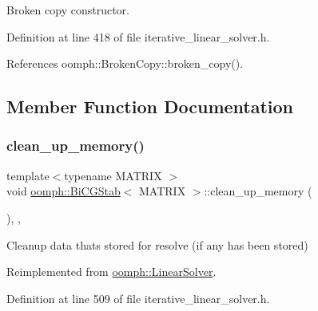 Broken copy constructor. 



Definition at line 418 of file iterative\+\_\+linear\+\_\+solver.\+h.



References oomph\+::\+Broken\+Copy\+::broken\+\_\+copy().



\subsection{Member Function Documentation}
\mbox{\label{classoomph_1_1BiCGStab_a6c97b794a4bec6a22df28f5f160577be}} 
\subsubsection{\texorpdfstring{clean\+\_\+up\+\_\+memory()}{clean\_up\_memory()}}
{\footnotesize\ttfamily template$<$typename M\+A\+T\+R\+IX $>$ \\
void \hyperlink{classoomph_1_1BiCGStab}{oomph\+::\+Bi\+C\+G\+Stab}$<$ M\+A\+T\+R\+IX $>$\+::clean\+\_\+up\+\_\+memory (\begin{DoxyParamCaption}{ }\end{DoxyParamCaption})\hspace{0.3cm}{\ttfamily [inline]}, {\ttfamily [private]}, {\ttfamily [virtual]}}



Cleanup data that\textquotesingle{}s stored for resolve (if any has been stored) 



Reimplemented from \hyperlink{classoomph_1_1LinearSolver_a9d66f3262e80ca06a365f98216afd85f}{oomph\+::\+Linear\+Solver}.



Definition at line 509 of file iterative\+\_\+linear\+\_\+solver.\+h.

\mbox{\label{classoomph_1_1BiCGStab_a7ed3198928966fddf84e9f908b3361d4}} 
